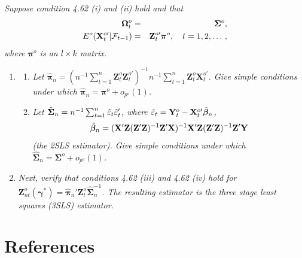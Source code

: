 \begin{exercises}
\item\label{ex:4.64} \textit{Suppose condition 4.62 (i) and (ii) hold and that}
\begin{eqnarray*}
\boldsymbol{\Omega}_t^o &=& \boldsymbol{\Sigma}^o, \\
E^o(\mathbf{X}_t^{o\prime}|\mathcal{F}_{t-1}) &=& \mathbf{Z}_t^{o\prime}\boldsymbol{\pi}^o, \quad t = 1, 2, \ldots\,,
\end{eqnarray*}
\textit{where $\boldsymbol{\pi}^o$ is an $l \times k$ matrix.}
\begin{enumerate}[label=(\roman*)]
\item \begin{enumerate}[label=(\alph*)]
\item \textit{Let $\hat{\boldsymbol{\pi}}_n = (n^{-1}\sum_{t=1}^{n}\mathbf{Z}_t^o\mathbf{Z}_t^{o\prime})^{-1}n^{-1}\sum_{t=1}^{n}\mathbf{Z}_t^o\mathbf{X}_t^{o\prime}$.
Give simple conditions under which $\hat{\boldsymbol{\pi}}_n = \boldsymbol{\pi}^o + o_{p^o}(1)$.}
\item \textit{Let $\hat{\boldsymbol{\Sigma}}_n = n^{-1}\sum_{t=1}^{n}\hat{\varepsilon}_t\hat{\varepsilon}_t'$, where $\hat{\varepsilon}_t = \mathbf{Y}_t^o - \mathbf{X}_t^{o\prime}\tilde{\boldsymbol{\beta}}_n$,}
\[
\tilde{\boldsymbol{\beta}}_n = (\mathbf{X}'\mathbf{Z}(\mathbf{Z}'\mathbf{Z})^{-1}\mathbf{Z}'\mathbf{X})^{-1}\mathbf{X}'\mathbf{Z}(\mathbf{Z}'\mathbf{Z})^{-1}\mathbf{Z}'\mathbf{Y}
\]
\textit{(the 2SLS estimator). Give simple conditions under which $\hat{\boldsymbol{\Sigma}}_n = \boldsymbol{\Sigma}^o + o_{p^o}(1)$.}
\end{enumerate}
\item \textit{Next, verify that conditions 4.62 (iii) and 4.62 (iv) hold for $\mathbf{Z}_{nt}^o(\boldsymbol{\gamma}^*) = \hat{\boldsymbol{\pi}}_n'\mathbf{Z}_t^o\hat{\boldsymbol{\Sigma}}_n^{-1}$. The resulting estimator is the three stage least squares (3SLS) estimator.}
\end{enumerate}
\end{exercises}

\section*{References}

